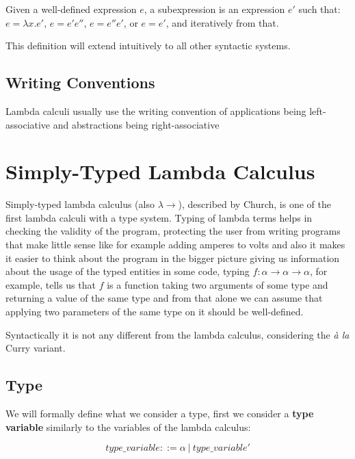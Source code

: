 \begin{defn}[Subexpression]
Given a well-defined expression $e$, a subexpression is an expression $e'$ such that: $e = \lambda x . e'$, $e = e' e''$, $e = e'' e'$, or $e = e'$, and iteratively from that.
\end{defn}

This definition will extend intuitively to all other syntactic systems.

\subsection{Writing Conventions}

Lambda calculi usually use the writing convention of applications being left-associative and abstractions being right-associative


\section{Simply-Typed Lambda Calculus }

Simply-typed lambda calculus (also $\lambda\rightarrow$), described by Church, is one of the first lambda calculi with a type system. Typing of lambda terms helps in checking the validity of the program, protecting the user from writing programs that make little sense like for example adding amperes to volts \cite{barendregt1992lambda} and also it makes it easier to think about the program in the bigger picture giving us information about the usage of the typed entities in some code, typing $f : \alpha \rightarrow \alpha \rightarrow \alpha$, for example, tells us that $f$ is a function taking two arguments of some type and returning a value of the same type and from that alone we can assume that applying two parameters of the same type on it should be well-defined.

Syntactically it is not any different from the lambda calculus, considering the \emph{\`a la} Curry variant. \cite{barendregt1992lambda}

\subsection{Type}

We will formally define what we consider a type, first we consider a \textbf{type variable} similarly to the variables of the lambda calculus:

\begin{defn}
    $$type\_variable ::= \alpha\ |\ type\_variable'$$
\end{defn}

